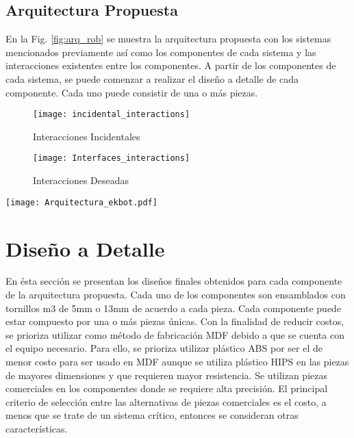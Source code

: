 \subsection{Arquitectura Propuesta}
En la Fig. \ref{fig:arq_rob} se muestra la arquitectura propuesta con los sistemas mencionados previamente así como los componentes de cada sistema y las interacciones existentes entre los componentes. A partir de los componentes de cada sistema, se puede comenzar a realizar el diseño a detalle de cada componente. Cada uno puede consistir de una o más piezas.


\begin{figure}
	\centering
		\texttt{[image: incidental\_interactions]}
	\caption{Interacciones Incidentales}
	\label{fig:incid_inter}
\end{figure}

\begin{figure}
	\centering
		\texttt{[image: Interfaces\_interactions]}
	\caption{Interacciones Deseadas}
	\label{fig:interfaces_diag}
\end{figure}

\begin{sidewaysfigure}
	\centering
		\texttt{[image: Arquitectura\_ekbot.pdf]}
	\caption{Arquitectura del Robot}
	\label{fig:arq_rob}
\end{sidewaysfigure}


\section{Diseño a Detalle}

En ésta sección se presentan los diseños finales obtenidos para cada componente de la arquitectura propuesta. Cada uno de los componentes son ensamblados con tornillos m3 de 5mm o 13mm de acuerdo a cada pieza. Cada componente puede estar compuesto por una o más piezas únicas. Con la finalidad de reducir costos, se prioriza utilizar como método de fabricación \gls{MDF} debido a que se cuenta con el equipo necesario. Para ello, se prioriza utilizar plástico \gls{ABS} por ser el de menor costo para ser usado en \gls{MDF} aunque se utiliza plástico \gls{HIPS} en las piezas de mayores dimensiones y que requieren mayor resistencia. Se utilizan piezas comerciales en los componentes donde se requiere alta precisión. El principal criterio de selección entre las alternativas de piezas comerciales es el costo, a menos que se trate de un sistema crítico, entonces se consideran otras características.

